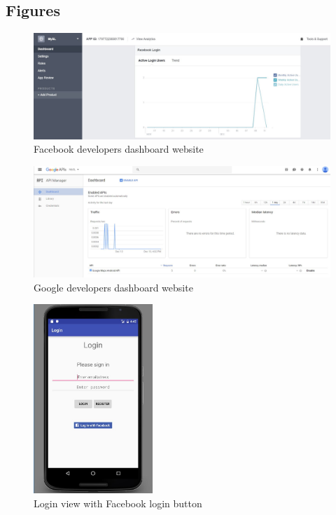 \documentclass[11pt,twoside,a4paper]{report}
\begin{document}
\begin{appendices}

\chapter{Figures}
\label{appendix}

\thispagestyle{empty}

\newpage

\begin{figure}
	\centering
	\includegraphics[width=1\textwidth]{jpg/facebook-developers.jpg}
	\caption{Facebook developers dashboard website}
	\label{figure:start-view}
\end{figure}

\begin{figure}
	\centering
	\includegraphics[width=1\textwidth]{jpg/google-developers.jpg}
	\caption{Google developers dashboard website}
	\label{figure:navigation-drawer-in-start-view}
\end{figure}

\begin{figure}
	\centering
	\includegraphics[width=0.4\textwidth]{jpg/facebook1.jpg}
	\caption{Login view with Facebook login button}
	\label{figure:navigation-drawer-in-start-view}
\end{figure}


\end{appendices}
\end{document}
